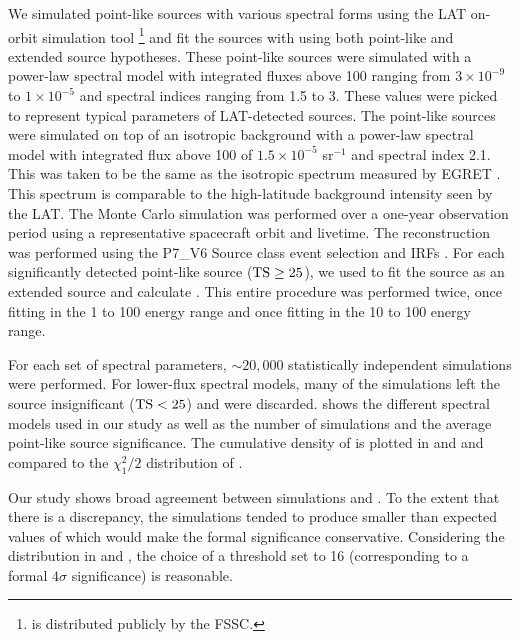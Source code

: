 We simulated point-like sources with various spectral forms using
the LAT on-orbit simulation tool
\gtobssim\footnote{\gtobssim is distributed publicly by the FSSC.} and fit the sources
with \pointlike using both point-like
and extended source hypotheses.  These point-like sources were simulated with a power-law
spectral model with integrated fluxes above 100 \mev ranging from $3\times10^{-9}$ 
to $1\times10^{-5}$ \fluxunits and spectral
indices ranging from 1.5 to 3.  These values
were picked to represent typical parameters of LAT-detected
sources. The point-like sources were simulated on top of an isotropic
background with a power-law spectral model with
integrated flux above 100 \mev of $1.5\times10^{-5}$ \fluxunits sr$^{-1}$
and spectral index 2.1.
This was
taken to be the same as the isotropic spectrum measured by EGRET
\citep{sreekumar_1998a_egret-observations}.  This spectrum is comparable
to the high-latitude background intensity seen by the LAT.
The Monte Carlo simulation was performed
over a one-year observation period using a representative 
spacecraft orbit and livetime.
The reconstruction was performed
using the P7\_V6 Source class event selection and IRFs \citep{ackermann_2012a_fermi-large}. For each 
significantly detected point-like source ($\mathrm{TS}\ge25$), we used \pointlike
to fit the source as an extended source and calculate \tsext.
This entire procedure was performed twice, once fitting in the 1 \gev
to 100 \gev energy range and once fitting in the 10 \gev to 100 \gev
energy range.

For each set of spectral parameters, $\sim20,000$ statistically independent
simulations were performed. For lower-flux spectral models, many of the
simulations left the source insignificant ($\mathrm{TS}<25$)
and were discarded.  
shows the different spectral models used in our study as well as the
number of simulations and the average point-like source
significance.  The cumulative density of \tsext is plotted in
 and  
and compared to the $\chi^2_1/2$ distribution of
.

Our study shows broad agreement between simulations and
. To the extent that there is
a discrepancy, the simulations tended to produce smaller than expected
values of \tsext which would make the formal significance conservative.
Considering the distribution in  and
, the choice of a threshold \tsext set to 16
(corresponding to a formal $4\sigma$ significance) is reasonable.


